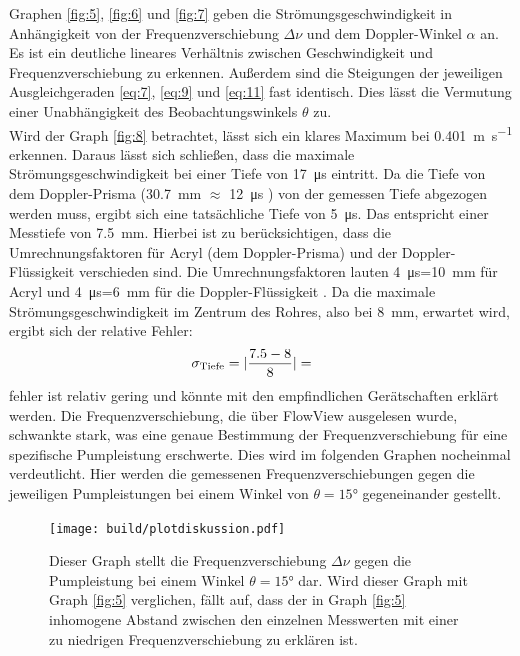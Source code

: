    \justifying Graphen \ref{fig:5}, \ref{fig:6} und \ref{fig:7} geben die Strömungsgeschwindigkeit in Anhängigkeit von der Frequenzverschiebung $\Delta\nu$ und
    dem Doppler-Winkel $\alpha$ an. Es ist ein deutliche lineares Verhältnis zwischen Geschwindigkeit und Frequenzverschiebung zu erkennen. Außerdem sind die Steigungen der 
    jeweiligen Ausgleichgeraden \eqref{eq:7}, \eqref{eq:9} und \eqref{eq:11} fast identisch. Dies lässt die Vermutung einer Unabhängigkeit des Beobachtungswinkels $\theta$ zu.\\
    Wird der Graph \ref{fig:8} betrachtet, lässt sich ein klares Maximum bei \SI{0.401}{\meter\per\second} erkennen. Daraus lässt sich schließen, dass die maximale Strömungsgeschwindigkeit
    bei einer Tiefe von \SI{17}{\micro\second} eintritt. Da die Tiefe von dem Doppler-Prisma (\SI{30.7}{\milli\meter} $\approx$ \SI{12}{\micro\second} \cite{V903}) von der gemessen Tiefe 
    abgezogen werden muss, ergibt sich eine tatsächliche Tiefe von \SI{5}{\micro\second}. Das entspricht einer Messtiefe von \SI{7.5}{\milli\meter}. Hierbei ist zu berücksichtigen,
    dass die Umrechnungsfaktoren für Acryl (dem Doppler-Prisma) und der Doppler-Flüssigkeit verschieden sind. Die Umrechnungsfaktoren lauten \SI{4}{\micro\second}=\SI{10}{\milli\meter}
    für Acryl und \SI{4}{\micro\second}=\SI{6}{\milli\meter} für die Doppler-Flüssigkeit \cite{V903}. Da die maximale Strömungsgeschwindigkeit im Zentrum des Rohres, also bei \SI{8}{\milli\meter}, 
    erwartet wird, ergibt sich der relative Fehler:
    \begin{align}
        \sigma_{\text{Tiefe}} &= \lvert\frac{7.5-8}{8}\rvert = \text{} \label{eq:13}
    \end{align}
    \justifying fehler ist relativ gering und könnte mit den empfindlichen Gerätschaften erklärt werden. Die Frequenzverschiebung, die über FlowView ausgelesen wurde, 
    schwankte stark, was eine genaue Bestimmung der Frequenzverschiebung für eine spezifische Pumpleistung erschwerte. Dies wird im folgenden Graphen nocheinmal verdeutlicht. Hier 
    werden die gemessenen Frequenzverschiebungen gegen die jeweiligen Pumpleistungen bei einem Winkel von $\theta=15°$ gegeneinander gestellt. 

\begin{figure}[H]
    \centering
    \texttt{[image: build/plotdiskussion.pdf]}
    \caption{Dieser Graph stellt die Frequenzverschiebung $\Delta\nu$ gegen die Pumpleistung bei einem Winkel $\theta=15°$ dar. Wird dieser Graph mit Graph \ref{fig:5} verglichen, fällt
    auf, dass der in Graph \ref{fig:5} inhomogene Abstand zwischen den einzelnen Messwerten mit einer zu niedrigen Frequenzverschiebung zu erklären ist.}
    \label{fig:10}
\end{figure}

